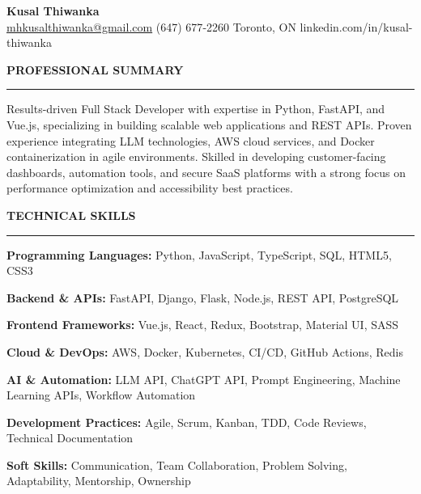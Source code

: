 \documentclass[10pt,letterpaper]{article}
\begin{document}
\begin{center}
{\LARGE\textbf{Kusal Thiwanka}}\\[3pt]
\href{mailto:mhkusalthiwanka@gmail.com}{mhkusalthiwanka@gmail.com}\hspace{2em}%
(647) 677{-}2260\hspace{2em}%
Toronto, ON\hspace{2em}
linkedin.com/in/kusal-thiwanka
\end{center}

\vspace{6pt}

\textbf{PROFESSIONAL SUMMARY}\\[-8pt]
\noindent\rule{\textwidth}{1pt}

\vspace{-2pt}

Results-driven Full Stack Developer with expertise in Python, FastAPI, and Vue.js, specializing in building scalable web applications and REST APIs. Proven experience integrating LLM technologies, AWS cloud services, and Docker containerization in agile environments. Skilled in developing customer-facing dashboards, automation tools, and secure SaaS platforms with a strong focus on performance optimization and accessibility best practices.

\vspace{8pt}

\textbf{TECHNICAL SKILLS}\\[-8pt]
\noindent\rule{\textwidth}{1pt}

\vspace{-2pt}

\textbf{Programming Languages:} Python, JavaScript, TypeScript, SQL, HTML5, CSS3

\textbf{Backend \& APIs:} FastAPI, Django, Flask, Node.js, REST API, PostgreSQL

\textbf{Frontend Frameworks:} Vue.js, React, Redux, Bootstrap, Material UI, SASS

\textbf{Cloud \& DevOps:} AWS, Docker, Kubernetes, CI/CD, GitHub Actions, Redis

\textbf{AI \& Automation:} LLM API, ChatGPT API, Prompt Engineering, Machine Learning APIs, Workflow Automation

\textbf{Development Practices:} Agile, Scrum, Kanban, TDD, Code Reviews, Technical Documentation

\textbf{Soft Skills:} Communication, Team Collaboration, Problem Solving, Adaptability, Mentorship, Ownership
\end{document}
